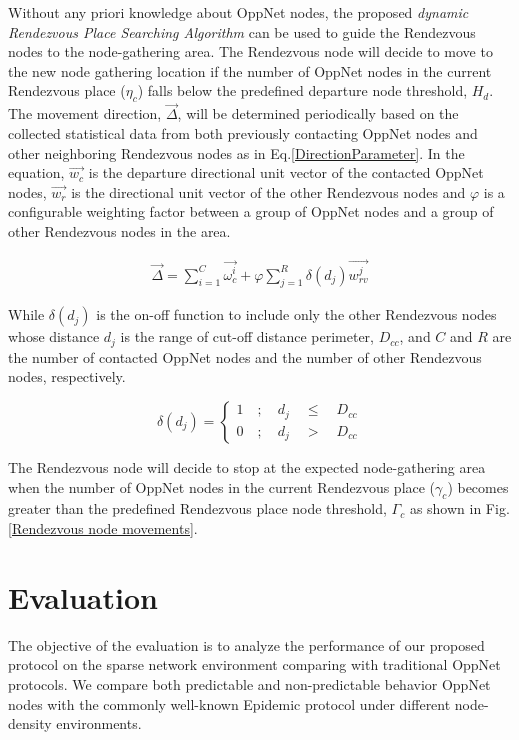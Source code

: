 Without any priori knowledge about OppNet nodes, the proposed \emph{dynamic Rendezvous Place Searching Algorithm} can be used to guide the Rendezvous nodes to the node-gathering area.
%
The Rendezvous node will decide to move to the new node gathering location if the number of OppNet nodes in the current Rendezvous place ($\eta_{c}$) falls below the predefined departure node threshold, $H_{d}$.
%
The movement direction, $\vec{\Delta}$, will be determined periodically based on the collected statistical data from both previously contacting OppNet nodes and other neighboring Rendezvous nodes as in Eq.\ref{DirectionParameter}.
%
In the equation, $\vec{w_c}$ is the departure directional unit vector of the contacted OppNet nodes, $\vec{w_r}$ is the directional unit vector of the other Rendezvous nodes and $\varphi$ is a configurable weighting factor between a group of OppNet nodes and a group of other Rendezvous nodes in the area.

\begin{eqnarray}
\label{DirectionParameter}
\vec{\Delta} =\sum _{ i=1 }^{ C }{ \vec { { \omega }_{ c }^{ i } }  } + \varphi \sum _{ j=1 }^{ R }{ \delta\left( d_{j} \right)
	\vec { {w }_{ rv }^{ j } }  }
\end{eqnarray}

While $\delta\left( d_{j} \right)$ is the on-off function to include only the other Rendezvous nodes whose distance $d_j$ is the range of cut-off distance perimeter, $D_{cc}$, and $C$ and $R$ are the number of contacted OppNet nodes and the number of other Rendezvous nodes, respectively.

\[\delta \left( { d }_{ j } \right) =\begin{cases} 1\quad ;\quad { d }_{ j }\quad \le { \quad D }_{ cc } \\ 0\quad ;\quad { d }_{ j }\quad >{ \quad D }_{ cc } \end{cases}  \] 

The Rendezvous node will decide to stop at the expected node-gathering area when the number of OppNet nodes in the current Rendezvous place ($\gamma_{c}$) becomes greater than the predefined Rendezvous place node threshold, $\Gamma_{c}$ as shown in Fig. \ref{Rendezvous node movements}.  
\section{Evaluation}
\label{DRRA:Evaluation}
The objective of the evaluation is to analyze the performance of our proposed protocol on the sparse network environment comparing with traditional OppNet protocols.
%
We compare both predictable and non-predictable behavior OppNet nodes with the commonly well-known Epidemic protocol\cite{Vahdat2000} under different node-density environments.

